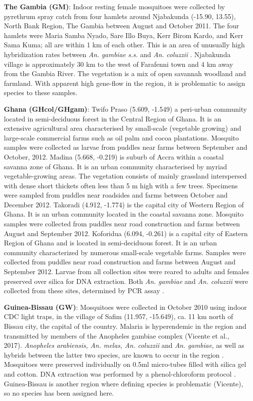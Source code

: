\documentclass[a4paper,11pt,abstracton,hidelinks]{scrartcl}
\begin{document}
%
\textbf{The Gambia (GM)}: Indoor resting female mosquitoes were collected by pyrethrum spray catch from four hamlets around Njabakunda (-15.90, 13.55), North Bank Region, The Gambia between August and October 2011.
%
The four hamlets were Maria Samba Nyado, Sare Illo Buya, Kerr Birom Kardo, and Kerr Sama Kuma; all are within 1 km of each other.
%
This is an area of unusually high hybridization rates between \textit{An. gambiae s.s.} and \textit{An. coluzzii} \cite{Caputo2008, Nwakanma2013}.
%
Njabakunda village is approximately 30 km to the west of Farafenni town and 4 km away from the Gambia River.
%
The vegetation is a mix of open savannah woodland and farmland.
%
With apparent high gene-flow in the region, it is problematic to assign species to these samples.

%
\textbf{Ghana (GHcol/GHgam)}: Twifo Praso (5.609, -1.549) a peri-urban community located in semi-deciduous forest in the Central Region of Ghana.
%
It is an extensive agricultural area characterised by small-scale (vegetable growing) and large-scale commercial farms such as oil palm and cocoa plantations.
%
Mosquito samples were collected as larvae from puddles near farms between September and October, 2012.
%
Madina (5.668,	-0.219) is suburb of Accra within a coastal savanna zone of Ghana. 
%
It is an urban community characterised by myriad vegetable-growing areas.
%
The vegetation consists of mainly grassland interspersed with dense short thickets often less than 5 m high with a few trees.
%
Specimens were sampled from puddles near roadsides and farms between October and December 2012.
%
Takoradi (4.912, -1.774) is the capital city of Western Region of Ghana.
%
It is an urban community located in the coastal savanna zone.
%
Mosquito samples were collected from puddles near road construction and farms between August and September 2012.
%
Koforidua (6.094, -0.261) is a capital city of Eastern Region of Ghana and is located in semi-deciduous forest. 
%
It is an urban community characterized by numerous small-scale vegetable farms. 
%
Samples were collected from puddles near road construction and farms between August and September 2012.
%
Larvae from all collection sites were reared to adults and females preserved over silica for DNA extraction.
%
Both \textit{An. gambiae} and \textit{An. coluzzii} were collected from these sites, determined by PCR assay \cite{Santolamazza2008}.

%
\textbf{Guinea-Bissau (GW)}: Mosquitoes were collected in October 2010 using indoor CDC light traps, in the village of Safim (11.957, -15.649), ca. 11 km north of Bissau city, the capital of the country.
%
Malaria is hyperendemic in the region and transmitted by members of the Anopheles gambiae complex (Vicente et al., 2017).
%
\textit{Anopheles arabiensis, An. melas, An. coluzzii} and \textit{An. gambiae}, as well as hybrids between the latter two species, are known to occur in the region \cite{Gordicho2014, Vicente2017}.
%
Mosquitoes were preserved individually on 0.5ml micro-tubes filled with silica gel and cotton. DNA extraction was performed by a phenol-chloroform protocol \cite{Donnelly1999}.
%
Guinea-Bissau is another region where defining species is problematic (Vicente), so no species has been assigned here.
\end{document}
